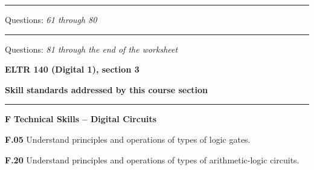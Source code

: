 \vskip 10pt
\hrule \vskip 5pt
\noindent
{}

\hskip 10pt Questions: {\it 61 through 80}
 
\vskip 10pt
\hrule \vskip 5pt
\noindent
{}

\hskip 10pt Questions: {\it 81 through the end of the worksheet}
 






\vfil \eject

\centerline{\bf ELTR 140 (Digital 1), section 3} \bigskip 
 
\vskip 10pt

\noindent
{\bf Skill standards addressed by this course section}

\vskip 5pt

\hrule \vskip 10pt
\noindent
{}

\vskip 5pt

\medskip
\item{\bf F} {\bf Technical Skills -- Digital Circuits}
\item{\bf F.05} Understand principles and operations of types of logic gates.
\item{\bf F.20} Understand principles and operations of types of arithmetic-logic circuits.
\medskip

\vskip 5pt

